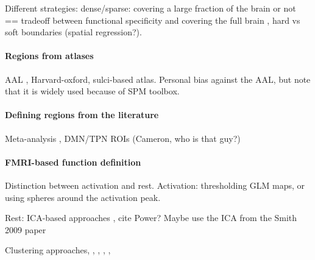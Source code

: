 \documentclass[5p]{elsarticle}
\begin{document}
Different strategies: 
dense/sparse: covering a large fraction of the
brain or not == tradeoff between functional specificity and covering the
full brain
, hard vs soft boundaries (spatial regression?).

\paragraph{Regions from atlases}

AAL \cite{tzourio-mazoyer2002a}, Harvard-oxford, sulci-based atlas.
Personal bias against the AAL, but note that it is widely used because of
SPM toolbox.

\paragraph{Defining regions from the literature}
Meta-analysis \cite{dosenbach}, DMN/TPN ROIs (Cameron, who is that guy?)

\paragraph{FMRI-based function definition}
Distinction between activation and rest.
Activation: thresholding GLM maps, or using spheres around the activation
peak.

Rest: ICA-based approaches \cite{kiviniemi2009} \cite{shirer2012}
\cite{varoquaux2011} \cite{yeo}, cite Power?
Maybe use the ICA from the Smith 2009 paper

Clustering approaches, \cite{craddock2011}, \cite{bellec}, \cite{flandin}, \cite{poline}, \cite{thirion}
\end{document}
